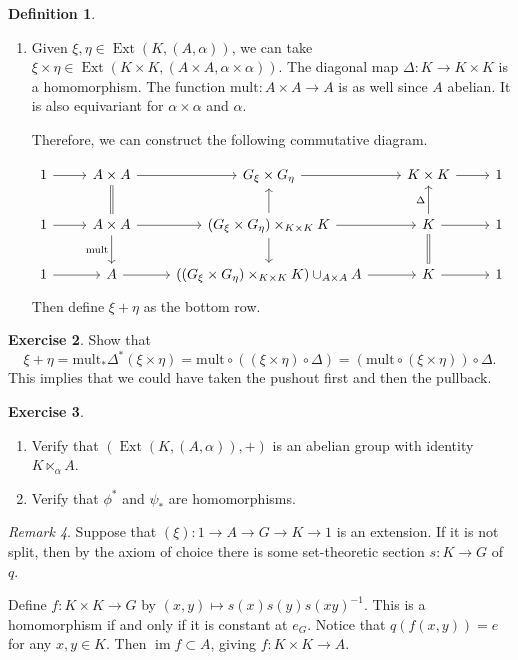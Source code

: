 \documentclass[10pt,letterpaper,cm]{nupset}
\theoremstyle{definition}
\newtheorem{definition}{Definition}[subsection]
\theoremstyle{theorem}
\newtheorem{exercise}[definition]{Exercise}
\theoremstyle{remark}
\newtheorem{remark}[definition]{Remark}
\newcommand{\1}{\mathbf{1}}
\newcommand{\0}{\vec 0}
\DeclareMathOperator{\ext}{Ext}
\DeclareMathOperator{\im}{im}
\begin{document}
\begin{definition}
\begin{enumerate}
\item Given $\xi, \eta \in \ext(K, (A, \alpha))$, we can take $\xi \times \eta \in \ext(K \times K, (A\times A, \alpha \times \alpha))$. The diagonal map $\Delta : K \to K \times K$ is a homomorphism. The function $\text{mult}: A \times A \to A$ is as well since $A$ abelian. It is also equivariant for $\alpha \times \alpha$ and $\alpha$.

Therefore, we can construct the following commutative diagram.

\[
\begin{tikzcd}
1 \arrow[r] & A\times A \arrow[r] & G_{\xi}\times G_{\eta} \arrow[r] & K\times K \arrow[r] & 1 \\
1 \arrow[r] & A\times A \arrow[r] \arrow[d, "\text{mult}"'] \arrow[u, equal] & (G_{\xi} \times G_{\eta}) \times_{K\times K} K \arrow[r] \arrow[u] \arrow[d] & K \arrow[r] \arrow[u, "\Delta"] \arrow[d, equal] & 1 \\
1 \arrow[r] & A \arrow[r] & ((G_{\xi} \times G_{\eta}) \times_{K\times K} K) \cup_{A\times A} A \arrow[r] & K \arrow[r] & 1
\end{tikzcd}
\]
Then define $\xi + \eta$ as the bottom row.
\end{enumerate}
\end{definition}

\begin{exercise}
Show that $$\xi + \eta = \text{mult}_{\ast} \Delta^{\ast}(\xi \times \eta) = \text{mult} \circ ((\xi \times \eta)\circ \Delta) = (\text{mult} \circ (\xi \times \eta))\circ \Delta.$$ This implies that we could have taken the pushout first and then the pullback.
\end{exercise}

\begin{exercise} $ $
\begin{enumerate}
\item Verify that $(\ext(K, (A, \alpha)), +)$ is an abelian group with identity $K \ltimes_{\alpha} A$. 
\item Verify that $\phi^{\ast}$ and $\psi_{\ast}$ are homomorphisms.  
\end{enumerate}
\end{exercise}

\begin{remark}
Suppose that $(\xi) : 1\to A \to G \to K \to 1$ is an extension. If it is not split, then by the axiom of choice there is some set-theoretic section $s: K \to G$ of $q$.

Define $f : K \times K\to G$ by $(x, y) \mapsto s(x)s(y)s(xy)^{-1}$. This is a homomorphism if and only if it is constant at $e_G$. Notice that $q(f(x,y)) = e$ for any $x,y\in K$. Then $\im f \subset A$, giving $f: K\times K \to A$.
\end{remark}
\end{document}
